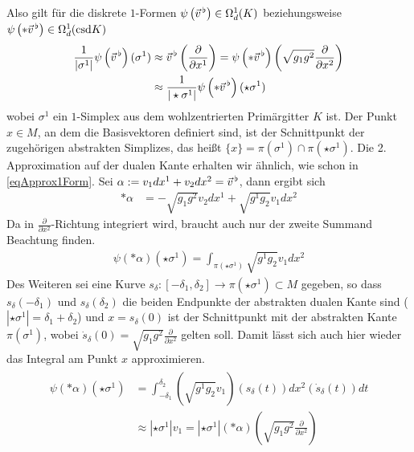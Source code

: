   Also gilt für die diskrete \( 1 \)-Formen \( \psi\left( \vec{v}^{\,\flat} \right) \in \Omega^{1}_{d}(K)\) beziehungsweise
  \( \psi\left( *\vec{v}^{\,\flat} \right) \in \Omega^{1}_{d}(\text{csd} K)\)
  \begin{align}
  \label{eqIntegralMittelStern1Form}
  \begin{aligned}
    \frac{1}{|\sigma^{1}|} \psi\left( \vec{v}^{\,\flat} \right)(\sigma^{1}) 
                      &\approx \vec{v}^{\,\flat}\left( \frac{\partial}{\partial x^{1}} \right)
                       = \psi\left( *\vec{v}^{\,\flat} \right)\left( \sqrt{g_{1}g^{2}} \frac{\partial}{\partial x^{2}} \right)\\
                      &\approx  \frac{1}{|\star\sigma^{1}|} \psi\left( *\vec{v}^{\,\flat} \right)(\star\sigma^{1})
  \end{aligned}
  \end{align}
  wobei \( \sigma^{1} \) ein \( 1 \)-Simplex aus dem wohlzentrierten Primärgitter \( K \) ist.
  Der Punkt \( x\in M \), an dem die Basisvektoren definiert sind, ist der Schnittpunkt der zugehörigen abstrakten Simplizes,
  das heißt \( \{x\} = \pi(\sigma^{1})\cap\pi(\star\sigma^{1}) \).
  Die 2. Approximation auf der dualen Kante erhalten wir ähnlich, wie schon in \eqref{eqApprox1Form}.
  Sei \( \alpha:=v_{1}dx^{1} + v_{2}dx^{2} = \vec{v}^{\,\flat} \), dann ergibt sich
  \begin{align}
    *\alpha &= -\sqrt{g_{1}g^{2}}v_{2}dx^{1} + \sqrt{g^{1}g_{2}}v_{1}dx^{2}
  \end{align}
  Da in \( \frac{\partial}{\partial x^{2}} \)-Richtung integriert wird, braucht auch nur der zweite Summand Beachtung finden.
  \begin{align}
    \psi\left( *\alpha \right)(\star\sigma^{1}) = \int_{\pi(\star\sigma^{1})} \sqrt{g^{1}g_{2}} v_{1} dx^{2}
  \end{align}
  Des Weiteren sei eine Kurve \( s_{\delta}:\left[ -\delta_{1}, \delta_{2} \right] \rightarrow \pi(\star\sigma^{1}) \subset M\) gegeben, so dass
  \( s_{\delta}(-\delta_{1}) \) und \( s_{\delta}(\delta_{2}) \) die beiden Endpunkte der abstrakten dualen Kante sind (\( |\star\sigma^{1}| = \delta_{1}+\delta_{2} \))
  und \( x = s_{\delta}(0) \) ist der 
  Schnittpunkt mit der abstrakten Kante \( \pi(\sigma^{1}) \), wobei \( \dot{s}_{\delta}(0) = \sqrt{g_{1}g^{2}} \frac{\partial}{\partial x^{2}} \) gelten soll.
  Damit lässt sich auch hier wieder das Integral am Punkt \( x \) approximieren.
  \begin{align}
  \begin{aligned}
    \psi\left( *\alpha \right)(\star\sigma^{1}) 
            &= \int_{-\delta_{1}}^{\delta_{2}} \left( \sqrt{g^{1}g_{2}} v_{1} \right)(s_{\delta}(t)) dx^{2}(\dot{s}_{\delta}(t)) dt \\
            &\approx |\star\sigma^{1}|v_{1} = |\star\sigma^{1}|(*\alpha)\left( \sqrt{g_{1}g^{2}} \frac{\partial}{\partial x^{2}}\right)
  \end{aligned}
  \end{align}
  
